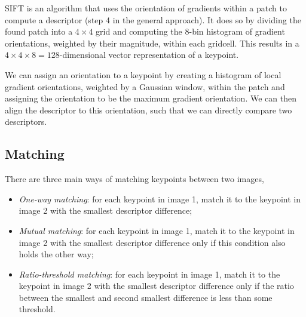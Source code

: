 SIFT \citep{lowe2004distinctive} is an algorithm that uses the orientation of
gradients within a patch to compute a descriptor (step 4 in the general
approach). It does so by dividing the found patch into a $4\times 4$ grid and
computing the 8-bin histogram of gradient orientations, weighted by their
magnitude, within each gridcell. This results in a $4\times 4\times
8=128$-dimensional vector representation of a keypoint.

We can assign an orientation to a keypoint by creating a histogram of local
gradient orientations, weighted by a Gaussian window, within the patch and
assigning the orientation to be the maximum gradient orientation. We can then
align the descriptor to this orientation, such that we can directly compare two
descriptors.

\subsection{Matching}

There are three main ways of matching keypoints between two images,
\begin{itemize}
  \item \textit{One-way matching}: for each keypoint in image 1, match it to the
    keypoint in image 2 with the smallest descriptor difference;
  \item \textit{Mutual matching}: for each keypoint in image 1, match it to the
    keypoint in image 2 with the smallest descriptor difference only if this condition
    also holds the other way;
  \item \textit{Ratio-threshold matching}: for each keypoint in image 1, match
    it to the keypoint in image 2 with the smallest descriptor difference only
    if the ratio between the smallest and second smallest difference is less
    than some threshold.
\end{itemize}
